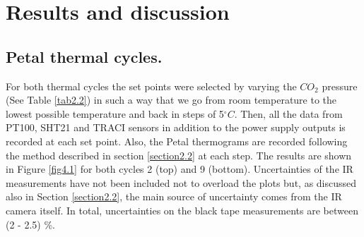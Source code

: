 \pagestyle{standard}

\chapter{Results and discussion}\label{chapter4}

	\thispagestyle{chapter-first-page}

	\section{Petal thermal cycles.}\label{section4.1}
	
		For both thermal cycles the set points were selected by varying the $CO_{2}$ pressure (See Table \ref{tab2.2}) in such a way that we go from room temperature to the lowest possible temperature and back in steps of 5\space$^\circ C$. Then, all the data from PT100, SHT21 and TRACI sensors in addition to the power supply outputs is recorded at each set point. Also, the Petal thermograms are recorded following the method described in section \ref{section2.2} at each step. The results are shown in Figure \ref{fig4.1} for both cycles 2 (top) and 9 (bottom). Uncertainties of the IR measurements have not been included not to overload the plots but, as discussed also in Section \ref{section2.2}, the main source of uncertainty comes from the IR camera itself. In total, uncertainties on the black tape measurements are between (2 - 2.5) \%.
		
